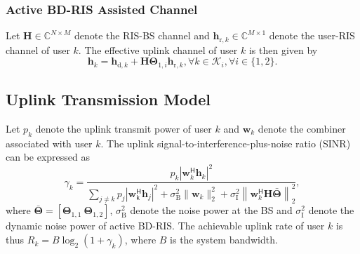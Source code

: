 \documentclass[conference]{IEEEtran}
\begin{document}
\subsubsection{Active BD-RIS Assisted Channel} Let $\mathbf{H}\in\mathbb{C}^{N\times M}$ denote the RIS-BS channel and $\mathbf{h}_{\mathrm{r},k}\in\mathbb{C}^{M\times 1}$ denote the user-RIS channel of user $k$. 
The effective uplink channel of user $k$ is then given by
\begin{equation}
\mathbf{h}_{k}
= \mathbf{h}_{\mathrm{d},k} + \mathbf{H}\mathbf{\Theta}_{1,i}\mathbf{h}_{\mathrm{r},k},\forall k\in\mathcal{K}_i,\forall i\in\{1,2\}.
\end{equation}

\subsection{Uplink Transmission Model}

Let $p_k$ denote the uplink transmit power of user $k$ and $\mathbf{w}_k$ denote the combiner associated with user $k$. The uplink signal-to-interference-plus-noise ratio (SINR) can be expressed as
\begin{equation}
\gamma_k
=
\frac{p_k\left|\mathbf{w}_k^\mathsf{H}\mathbf{h}_{k}\right|^2}
{\sum\limits_{j\neq k}p_j\left|\mathbf{w}_\mathsf{k}^\mathsf{H}\mathbf{h}_{j}\right|^2
+\sigma_\mathrm{B}^2\|\mathbf{w}_k\|_2^2
+\sigma_\mathrm{I}^2\left\|\mathbf{w}_k^\mathsf{H}\mathbf{H}\bar{\mathbf{\Theta}}\right\|_2^2},
\end{equation}
where $\bar{\mathbf{\Theta}} = [\mathbf{\Theta}_{1,1}~\mathbf{\Theta}_{1,2}]$,  $\sigma_\mathrm{B}^2$ denote the noise power at the BS and $\sigma_\mathrm{I}^2$ denote the dynamic noise power of active BD-RIS.
The achievable uplink rate of user $k$ is thus 
$R_k = B\log_2(1+\gamma_k)$, where $B$ is the system bandwidth.


\end{document}
